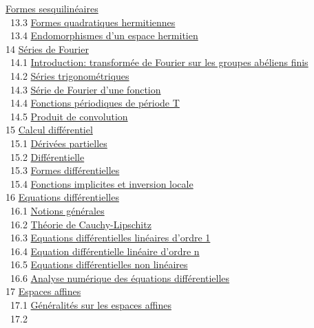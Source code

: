 \documentclass[]{article}
\begin{document}
\href{coursse74.html\#x90-40500013.2}{Formes sesquilinéaires} \\ ~13.3
\href{coursse75.html\#x91-41200013.3}{Formes quadratiques hermitiennes}
\\ ~13.4 \href{coursse76.html\#x92-41700013.4}{Endomorphismes d'un
espace hermitien} \\ 14 \href{coursch15.html\#x93-42400014}{Séries de
Fourier} \\ ~14.1 \href{coursse77.html\#x94-42500014.1}{Introduction:
transformée de Fourier sur les groupes abéliens finis} \\ ~14.2
\href{coursse78.html\#x95-42800014.2}{Séries trigonométriques} \\ ~14.3
\href{coursse79.html\#x96-43200014.3}{Série de Fourier d'une fonction}
\\ ~14.4 \href{coursse80.html\#x97-43900014.4}{Fonctions périodiques de
période T} \\ ~14.5 \href{coursse81.html\#x98-44000014.5}{Produit de
convolution} \\ 15 \href{coursch16.html\#x99-44300015}{Calcul
différentiel} \\ ~15.1 \href{coursse82.html\#x100-44400015.1}{Dérivées
partielles} \\ ~15.2
\href{coursse83.html\#x101-45100015.2}{Différentielle} \\ ~15.3
\href{coursse84.html\#x102-45800015.3}{Formes différentielles} \\ ~15.4
\href{coursse85.html\#x103-46500015.4}{Fonctions implicites et inversion
locale} \\ 16 \href{coursch17.html\#x104-47000016}{Equations
différentielles} \\ ~16.1 \href{coursse86.html\#x105-47100016.1}{Notions
générales} \\ ~16.2 \href{coursse87.html\#x106-47700016.2}{Théorie de
Cauchy-Lipschitz} \\ ~16.3
\href{coursse88.html\#x107-47900016.3}{Equations différentielles
linéaires d'ordre 1} \\ ~16.4
\href{coursse89.html\#x108-48600016.4}{Equation différentielle linéaire
d'ordre n} \\ ~16.5 \href{coursse90.html\#x109-49500016.5}{Equations
différentielles non linéaires} \\ ~16.6
\href{coursse91.html\#x110-50400016.6}{Analyse numérique des équations
différentielles} \\ 17 \href{coursch18.html\#x111-50800017}{Espaces
affines} \\ ~17.1 \href{coursse92.html\#x112-50900017.1}{Généralités sur
les espaces affines} \\ ~17.2
\end{document}
